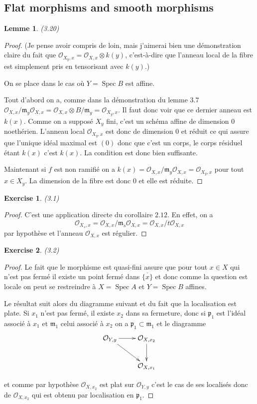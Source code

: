 \documentclass[A4, 11pt]{article}
\newtheorem{lem}[defin]{Lemme}
\newtheorem{exer}{Exercise}
\def\Spec{ \operatorname{Spec}}
\begin{document}
\subsection{Flat morphisms and smooth morphisms}
\begin{lem}(3.20)
\end{lem}
\begin{proof}
(Je pense avoir compris de loin, mais j'aimerai bien une démonstration claire du fait que $\mathcal{O}_{X_y,x}= \mathcal{O}_{X,x}\otimes k(y)$, c'est-à-dire que l'anneau local de la fibre est simplement pris en tensorisant avec $k(y)$.)

On se place dans le cas où $Y=\Spec B$ est affine.

Tout d'abord on a, comme dans la démonstration du lemme $3.7$ $\mathcal{O}_{X,x}/\mathfrak{m}_y\mathcal{O}_{X,x}=\mathcal{O}_{X,x}\otimes B/\mathfrak{m}_y=\mathcal{O}_{X_y,x}$. Il faut donc voir que ce dernier anneau est $k(x)$. Comme on a supposé $X_y$ fini, c'est un schéma affine de dimension $0$ noethérien. L'anneau local $\mathcal{O}_{X_y,x}$ est donc de dimension $0$ et réduit ce qui assure que l'unique idéal maximal est $(0)$ donc que c'est un corps, le corps résiduel étant $k(x)$ c'est $k(x)$. La condition est donc bien suffisante.

Maintenant si $f$ est non ramifié on a $k(x)=\mathcal{O}_{X,x}/\mathfrak{m}_y\mathcal{O}_{X,x}=\mathcal{O}_{X_y,x}$ pour tout $x\in X_y$. La dimension de la fibre est donc $0$ et elle est réduite. 
\end{proof}
\begin{exer}(3.1)
\end{exer}
\begin{proof}
C'est une application directe du corollaire $2.12$. En effet, on a 
$$\mathcal{O}_{X_s,x}=\mathcal{O}_{X,x}/\mathfrak{m}_s\mathcal{O}_{X,x}=\mathcal{O}_{X,x}/t\mathcal{O}_{X,x}$$
par hypothèse et l'anneau $\mathcal{O}_{X,x}$ est régulier.
\end{proof}
\begin{exer}(3.2)
\end{exer}
\begin{proof}
Le fait que le morphisme est quasi-fini assure que pour tout $x\in X$ qui n'est pas fermé il existe un point fermé dans $\overline{\{x\}}$ et donc comme la question est locale on peut se restreindre à $X=\Spec A$ et $Y=\Spec B$ affines.

Le résultat suit alors du diagramme suivant et du fait que la localisation est plate.
Si $x_1$ n'est pas fermé, il existe $x_2$ dans sa fermeture, donc si $\mathfrak{p}_1$ est l'idéal associé à $x_1$ et $\mathfrak{m}_1$ celui associé à $x_2$ on a $\mathfrak{p}_1 \subset \mathfrak{m}_1$ et le diagramme
$$\xymatrix{
\mathcal{O}_{Y,y} \ar[r] \ar[dr] & \mathcal{O}_{X,x_2}\ar[d] \\
 & \mathcal{O}_{X,x_1}
}$$

et comme par hypothèse $\mathcal{O}_{X,x_2}$ est plat sur $\mathcal{O}_{Y,y}$ c'est le cas de ses localisés donc de $\mathcal{O}_{X,x_2}$ qui est obtenu par localisation en $\mathfrak{p}_1$. 

\end{proof}
\end{document}

